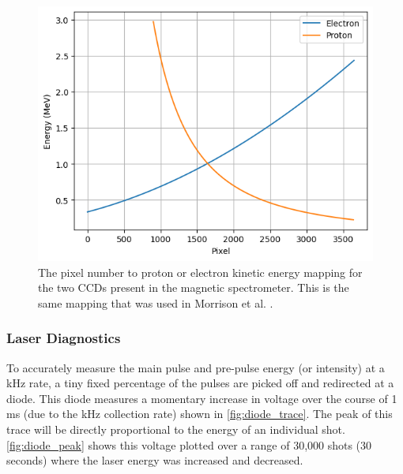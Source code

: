 \begin{figure}
	\centering 
	\includegraphics[width=0.75\linewidth]{planning/images/daq/pixel.png}
	\caption{The pixel number to proton or electron kinetic energy mapping for the two \gls{CCD}s present in the magnetic spectrometer. This is the same mapping that was used in Morrison et al. \cite{Morrison_2018_NJoP}.}
	\label{fig:pixel_energy}
\end{figure}

\subsubsection{Laser Diagnostics}
To accurately measure the main pulse and pre-pulse energy (or intensity) at a kHz rate, a tiny fixed percentage of the pulses are picked off and redirected at a diode. This diode measures a momentary increase in voltage over the course of 1 ms (due to the kHz collection rate) shown in \autoref{fig:diode_trace}. The peak of this trace will be directly proportional to the energy of an individual shot. \autoref{fig:diode_peak} shows this voltage plotted over a range of 30,000 shots (30 seconds) where the laser energy was increased and decreased.

